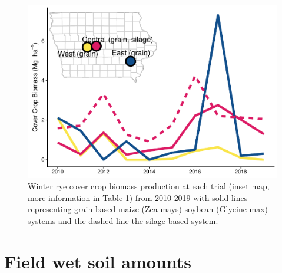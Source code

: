 \documentclass[
]{article}
\begin{document}
\begin{figure}
\centering
\includegraphics{supp-mat_files/figure-latex/unnamed-chunk-1-1.pdf}
\caption{Winter rye cover crop biomass production at each trial (inset
map, more information in Table 1) from 2010-2019 with solid lines
representing grain-based maize (Zea mays)-soybean (Glycine max) systems
and the dashed line the silage-based system.}
\end{figure}

\newpage

\hypertarget{field-wet-soil-amounts}{%
\section{Field wet soil amounts}\label{field-wet-soil-amounts}}
\end{document}
